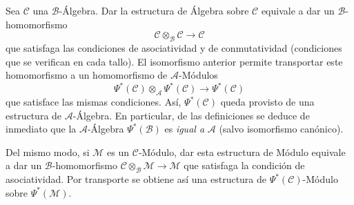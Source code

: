 \begin{env}[4.3.4]
\label{0.4.3.4-fr}
Sea $\mathcal{C}$ una $\mathcal{B}$-Álgebra. Dar la estructura de
Álgebra sobre $\mathcal{C}$ equivale a dar un $\mathcal{B}$-homomorfismo
\[
  \mathcal{C}\otimes_{\mathcal{B}}\mathcal{C}\longrightarrow\mathcal{C}
\]
que satisfaga las condiciones de asociatividad y de conmutatividad
(condiciones que se verifican en cada tallo). El isomorfismo anterior
permite transportar este homomorfismo a un homomorfismo de
$\mathcal{A}$-Módulos
\[
  \Psi^*(\mathcal{C})\otimes_{\mathcal{A}}\Psi^*(\mathcal{C})
  \longrightarrow\Psi^*(\mathcal{C})
\]
que satisface las mismas condiciones. Así, $\Psi^*(\mathcal{C})$ queda
provisto de una estructura de $\mathcal{A}$-Álgebra. En particular, de
las definiciones se deduce de inmediato que la $\mathcal{A}$-Álgebra
$\Psi^*(\mathcal{B})$ es \emph{igual a} $\mathcal{A}$ (salvo isomorfismo
canónico).

Del mismo modo, si $\mathcal{M}$ es un $\mathcal{C}$-Módulo, dar esta
estructura de Módulo equivale
a dar un $\mathcal{B}$-homomorfismo
$\mathcal{C}\otimes_{\mathcal{B}}\mathcal{M}\to\mathcal{M}$ que satisfaga
la condición de asociatividad. Por transporte se obtiene así una
estructura de $\Psi^*(\mathcal{C})$-Módulo sobre $\Psi^*(\mathcal{M})$.
\end{env}
